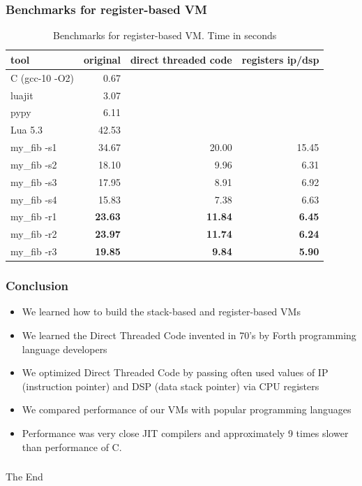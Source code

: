 \documentclass[hyperref={colorlinks=true},xcolor=table]{beamer}
\begin{document}
\begin{frame}[fragile]
  \frametitle{Benchmarks for register-based VM}
  \begin{table}
    \begin{tabular}{ | l | r | r | r | }
      \hline
      \rowcolor{lightgray} tool & original & direct threaded
      code & registers ip/dsp \\
      \hline
      C (gcc-10 -O2) &   0.67   &       & \\
      luajit         &   3.07   &       & \\
      pypy           &   6.11   &       & \\
      Lua 5.3        &  42.53   &       & \\
      \hline
      my\_fib -s1    &  34.67   & 20.00 & 15.45 \\
      my\_fib -s2    &  18.10   & 9.96  & 6.31 \\
      my\_fib -s3    &  17.95   & 8.91  & 6.92 \\
      my\_fib -s4    &  15.83   & 7.38  & 6.63 \\
      my\_fib -r1    &  \textbf{23.63}   & \textbf{11.84} & \textbf{6.45} \\
      my\_fib -r2    &  \textbf{23.97}   & \textbf{11.74} & \textbf{6.24} \\
      my\_fib -r3    &  \textbf{19.85}   & \textbf{9.84}  & \textbf{5.90} \\
      \hline
    \end{tabular}
    \caption{Benchmarks for register-based VM. Time in seconds}
  \end{table}
\end{frame}

\begin{frame}[fragile]
  \frametitle{Conclusion}
  \begin{itemize}
  \item We learned how to build the stack-based and register-based VMs
  \item We learned the Direct Threaded Code invented in 70's by Forth
    programming language developers
  \item We optimized Direct Threaded Code by passing often used values
    of IP (instruction pointer) and DSP (data stack pointer) via CPU
    registers
  \item We compared performance of our VMs with popular programming
    languages
  \item Performance was very close JIT compilers and approximately 9
    times slower than performance of C.
  \end{itemize}
\end{frame}

\begin{frame}[fragile]
  \frametitle{}
  \begin{center}
    \Huge{The End}
  \end{center}
\end{frame}

\end{document}
